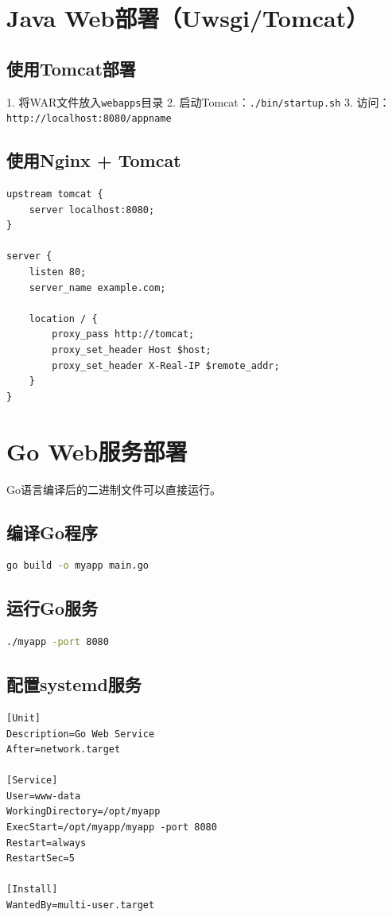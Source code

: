 \documentclass[12pt,UTF8]{ctexbook}
\begin{document}
\section{Java Web部署（Uwsgi/Tomcat）}
\label{sec:java-web}

\subsection*{使用Tomcat部署}
1. 将WAR文件放入\texttt{webapps}目录
2. 启动Tomcat：\texttt{./bin/startup.sh}
3. 访问：\texttt{http://localhost:8080/appname}

\subsection*{使用Nginx + Tomcat}
\begin{lstlisting}
upstream tomcat {
    server localhost:8080;
}

server {
    listen 80;
    server_name example.com;
    
    location / {
        proxy_pass http://tomcat;
        proxy_set_header Host $host;
        proxy_set_header X-Real-IP $remote_addr;
    }
}
\end{lstlisting}

\section{Go Web服务部署}
\label{sec:go-web}

Go语言编译后的二进制文件可以直接运行。

\subsection*{编译Go程序}
\begin{lstlisting}[language=bash]
go build -o myapp main.go
\end{lstlisting}

\subsection*{运行Go服务}
\begin{lstlisting}[language=bash]
./myapp -port 8080
\end{lstlisting}

\subsection*{配置systemd服务}
\begin{lstlisting}
[Unit]
Description=Go Web Service
After=network.target

[Service]
User=www-data
WorkingDirectory=/opt/myapp
ExecStart=/opt/myapp/myapp -port 8080
Restart=always
RestartSec=5

[Install]
WantedBy=multi-user.target
\end{lstlisting}
\end{document}
